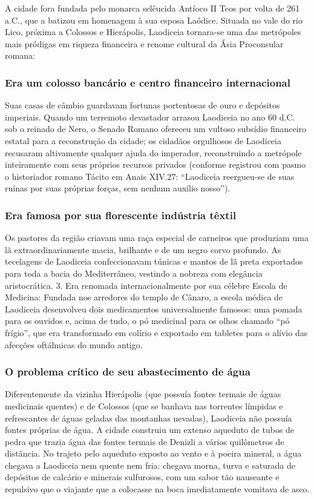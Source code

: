 \documentclass[11pt,a4paper,openany]{book}
\begin{document}
A cidade fora fundada pelo monarca selêucida Antíoco II Teos por volta de 261 a.C., que a batizou em homenagem à sua esposa Laódice. Situada no vale do rio Lico, próxima a Colossos e Hierápolis, Laodiceia tornara-se uma das metrópoles mais pródigas em riqueza financeira e renome cultural da Ásia Proconsular romana:

\subsubsection*{Era um colosso bancário e centro financeiro internacional}
Suas casas de câmbio guardavam fortunas portentosas de ouro e depósitos imperiais. Quando um terremoto devastador arrasou Laodiceia no ano 60 d.C. sob o reinado de Nero, o Senado Romano ofereceu um vultoso subsídio financeiro estatal para a reconstrução da cidade; os cidadãos orgulhosos de Laodiceia recusaram altivamente qualquer ajuda do imperador, reconstruindo a metrópole inteiramente com seus próprios recursos privados (conforme registrou com pasmo o historiador romano Tácito em Anais XIV.27: ``Laodiceia reergueu-se de suas ruínas por suas próprias forças, sem nenhum auxílio nosso'').

\subsubsection*{Era famosa por sua florescente indústria têxtil}
Os pastores da região criavam uma raça especial de carneiros que produziam uma lã extraordinariamente macia, brilhante e de um negro corvo profundo. As tecelagens de Laodiceia confeccionavam túnicas e mantos de lã preta exportados para toda a bacia do Mediterrâneo, vestindo a nobreza com elegância aristocrática.
3. Era renomada internacionalmente por sua célebre Escola de Medicina: Fundada nos arredores do templo de Cânaro, a escola médica de Laodiceia desenvolveu dois medicamentos universalmente famosos: uma pomada para os ouvidos e, acima de tudo, o pó medicinal para os olhos chamado ``pó frígio'', que era transformado em colírio e exportado em tabletes para o alívio das afecções oftálmicas do mundo antigo.

\subsubsection*{O problema crítico de seu abastecimento de água}
Diferentemente da vizinha Hierápolis (que possuía fontes termais de águas medicinais quentes) e de Colossos (que se banhava nas torrentes límpidas e refrescantes de águas geladas das montanhas nevadas), Laodiceia não possuía fontes próprias de água. A cidade construiu um extenso aqueduto de tubos de pedra que trazia água das fontes termais de Denizli a vários quilômetros de distância. No trajeto pelo aqueduto exposto ao vento e à poeira mineral, a água chegava a Laodiceia nem quente nem fria: chegava morna, turva e saturada de depósitos de calcário e minerais sulfurosos, com um sabor tão nauseante e repulsivo que o viajante que a colocasse na boca imediatamente vomitava de asco.
\end{document}
